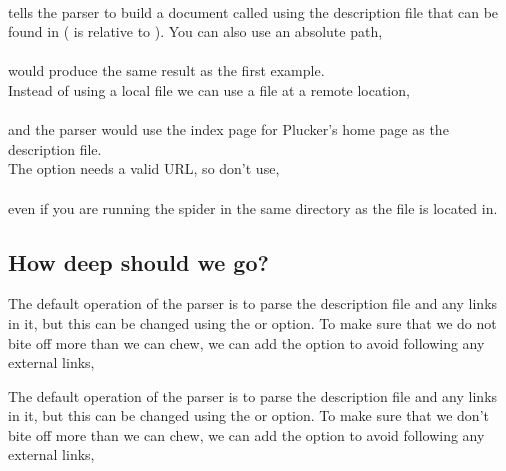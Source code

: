 \\

tells the parser to build a document called  using the
description file  that can be found in 
( is relative to ). You can also use
an absolute path,\\

\\

would produce the same result as the first example.\\

Instead of using a local file we can use a file at a remote location,\\

\\

and the parser would use the index page for Plucker's home page as the
description file.\\

\note{} The  option needs a valid URL, so
don't use, \\

\\

even if you are running the spider in the same directory as the file is
located in.

\subsection{How deep should we go?}\label{sec:Depth}

\begin{latexonly}
The default operation of the parser is to parse the description file
and any links in it, but this can be changed using the 
or  option. To make sure that we
do not bite off more than we can chew, we can add the
 option to avoid following any
external links,\\

\end{latexonly}
\begin{htmlonly}
The default operation of the parser is to parse the description file
and any links in it, but this can be changed using the 
or  option. To make sure that we
don't bite off more than we can chew, we can add the 
option to avoid following any external links,\\

\end{htmlonly}\\

